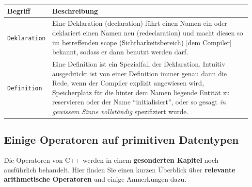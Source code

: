 \documentclass[a4paper]{report}
\begin{document}
\begin{center}
\begin{tabular}{|p{3cm}|p{12cm}|}
	\hline
	\textbf{Begriff} & \textbf{Beschreibung} \\ \hline
	\texttt{Deklaration} & Eine Deklaration (declaration) führt einen Namen ein oder deklariert einen Namen neu (redeclaration) und macht diesen so im betreffenden scope (Sichtbarkeitsbereich) [dem Compiler] bekannt, sodass er dann benutzt werden darf. \\ \hline
	\texttt{Definition} & Eine Definition ist ein Spezialfall der Deklaration. Intuitiv ausgedrückt ist von einer Definition immer genau dann die Rede, wenn der Compiler explizit angewiesen wird, Speicherplatz für die hinter dem Namen liegende Entität zu reservieren oder der Name "`initialisiert"', oder so gesagt \textit{in gewissem Sinne vollständig} spezifiziert wurde. \\ \hline %
\end{tabular}
\end{center}

%	



\subsection{Einige Operatoren auf primitiven Datentypen}
Die Operatoren von C++ werden in einem \textbf{gesonderten Kapitel} noch ausführlich behandelt. Hier finden Sie einen kurzen Überblick über \textbf{relevante arithmetische Operatoren} und einige Anmerkungen dazu.
\end{document}
